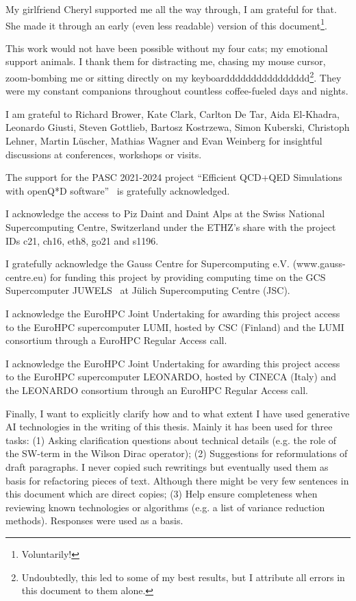 My girlfriend Cheryl supported me all the way through, I am grateful for that.
She made it through an early (even less readable) version of this document\footnote{Voluntarily!}.

This work would not have been possible without my four cats;
my emotional support animals.
I thank them for distracting me, chasing my mouse cursor, zoom-bombing me or sitting directly on my keyboardddddddddddddddd\footnote{Undoubtedly, this led to some of my best results, but I attribute all errors in this document to them alone.}.
They were my constant companions throughout countless coffee-fueled days and nights.

I am grateful to Richard Brower, Kate Clark, Carlton De Tar, Aida El-Khadra, Leonardo Giusti, Steven Gottlieb, Bartosz Kostrzewa, Simon Kuberski, Christoph Lehner, Martin Lüscher, Mathias Wagner and Evan Weinberg for insightful discussions at conferences, workshops or visits.

The support for the PASC 2021-2024 project ``Efficient QCD+QED Simulations with openQ*D software''~\cite{online:pasc2021} is gratefully acknowledged.

I acknowledge the access to Piz Daint and Daint Alps at the Swiss National Supercomputing Centre, Switzerland under the ETHZ’s share with the project IDs c21, ch16, eth8, go21 and s1196.

I gratefully acknowledge the Gauss Centre for Supercomputing e.V. (www.gauss-centre.eu) for funding this project by providing computing time on the GCS Supercomputer JUWELS~\cite{juwels} at Jülich Supercomputing Centre (JSC). 

I acknowledge the EuroHPC Joint Undertaking for awarding this project access to the EuroHPC supercomputer LUMI, hosted by CSC (Finland) and the LUMI consortium through a EuroHPC Regular Access call.

I acknowledge the EuroHPC Joint Undertaking for awarding this project access to the EuroHPC supercomputer LEONARDO, hosted by CINECA (Italy) and the LEONARDO consortium through an EuroHPC Regular Access call.


Finally, I want to explicitly clarify how and to what extent I have used generative AI technologies in the writing of this thesis.
Mainly it has been used for three tasks:
(1) Asking clarification questions about technical details (e.g. the role of the SW-term in the Wilson Dirac operator);
(2) Suggestions for reformulations of draft paragraphs. 
I never copied such rewritings but eventually used them as basis for refactoring pieces of text.
Although there might be very few sentences in this document which are direct copies;
(3) Help ensure completeness when reviewing known technologies or algorithms (e.g. a list of variance reduction methods).
Responses were used as a basis.


\endgroup


